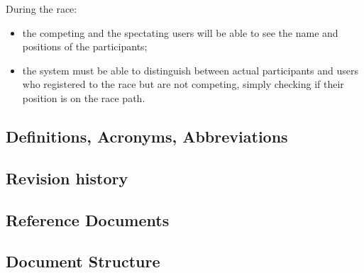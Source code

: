 During the race: 
\begin{itemize}
\item 
the competing and the spectating users will be able to see the name and positions of the participants; 
\item 
the system must be able to distinguish between actual participants and users who registered to the race but are not competing, simply checking if their position is on the race path.
\end{itemize}

\subsection{Definitions, Acronyms, Abbreviations}
\subsection{Revision history}
\subsection{Reference Documents }
\subsection{Document Structure}

